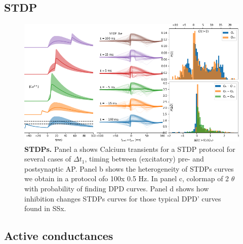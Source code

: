 \documentclass[10pt,letterpaper]{article}
\begin{document}


\subsection*{STDP}

\begin{figure}[htb!]
\includegraphics[width=1.0\linewidth]{f4}
\caption{{\bf STDPs.} Panel a shows Calcium transients for a STDP protocol for several cases of $\Delta t_1$, timing between (excitatory) pre- and postsynaptic AP. Panel b shows the heterogeneity of STDPs curves we obtain in a protocol ofo 100x 0.5 Hz. In panel c, colormap of 2 $\theta$ with probability of finding DPD curves. Panel d shows how inhibition changes STDPs curves for those typical DPD' curves found in SSx. 
}\label{fig:stdps}
\end{figure}



\subsection*{Active conductances}\label{sec:active conductances}
\end{document}
